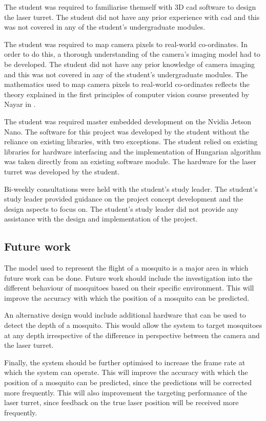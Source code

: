 The student was required to familiarise themself with 3D \gls{cad} software to design the laser turret. The student did not have any prior experience with \gls{cad} and this was not covered in any of the student's undergraduate modules.

The student was required to map camera pixels to real-world co-ordinates. In order to do this, a thorough understanding of the camera's imaging model had to be developed. The student did not have any prior knowledge of camera imaging and this was not covered in any of the student's undergraduate modules. The mathematics used to map camera pixels to real-world co-ordinates reflects the theory explained in the first principles of computer vision course presented by Nayar in \cite{Nayar}.

The student was required master embedded development on the Nvidia Jetson Nano. The software for this project was developed by the student without the reliance on existing libraries, with two exceptions. The student relied on existing libraries for hardware interfacing and the implementation of Hungarian algorithm was taken directly from an existing software module. The hardware for the laser turret was developed by the student.

Bi-weekly consultations were held with the student's study leader. The student's study leader provided guidance on the project concept development and the design aspects to focus on. The student's study leader did not provide any assistance with the design and implementation of the project.


\subsection{Future work}
The model used to represent the flight of a mosquito is a major area in which future work can be done. Future work should include the investigation into the different behaviour of mosquitoes based on their specific environment. This will improve the accuracy with which the position of a mosquito can be predicted.

An alternative design would include additional hardware that can be used to detect the depth of a mosquito. This would allow the system to target mosquitoes at any depth irrespective of the difference in perspective between the camera and the laser turret.

Finally, the system should be further optimised to increase the frame rate at which the system can operate. This will improve the accuracy with which the position of a mosquito can be predicted, since the predictions will be corrected more frequently. This will also improvement the targeting performance of the laser turret, since feedback on the true laser position will be received more frequently.
\newpage



